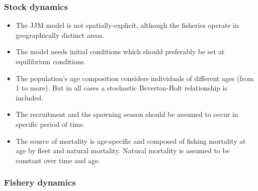 \documentclass{article}
\begin{document}
\subsubsection{Stock dynamics}

\begin{itemize}

\item The JJM model is not spatially-explicit, although the fisheries operate in geographically distinct areas.

\item The model needs initial conditions which should preferably be set at equilibrium conditions.

\item The population's age composition considers individuals of different ages (from 1 to more). But in all cases a stochastic Beverton-Holt relationship is included.

\item The recruitment and the spawning season should be assumed to occur in specific period of time.


\item The source of mortality is age-specific and composed of fishing mortality at age by fleet and natural mortality. Natural mortality is assumed to be constant over time and age.

\end{itemize}

\subsubsection{Fishery dynamics}
\end{document}
